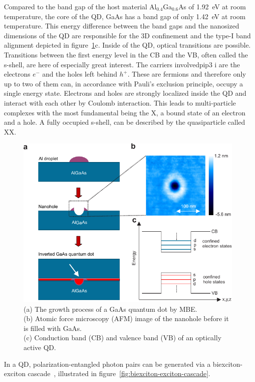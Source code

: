 Compared to the band gap of the host material Al$_{0.4}$Ga$_{0.6}$As of \SI{1.92}{\electronvolt} at room temperature, the core of the \ac{QD}, GaAs has a band gap of only \SI{1.42}{\electronvolt} at room temperature.
This energy difference between the band gaps and the nanosized dimensions of the \ac{QD} are responsible for the $3$D confinement and the type-I band alignment depicted in figure~\ref{fig:droplet-etched-gaas-qds}c.
Inside of the \ac{QD}, optical transitions are possible.
Transitions between the first energy level in the \ac{CB} and the \ac{VB}, often called the s-shell, are here of especially great interest.
The carriers involvedpip3 i are the electrons $e^-$ and the holes left behind $h^+$.
These are fermions and therefore only up to two of them can, in accordance with Pauli's exclusion principle, occupy a single energy state.
Electrons and holes are strongly localized inside the \ac{QD} and interact with each other by Coulomb interaction.
This leads to multi-particle complexes with the most fundamental being the \acf{X}, a bound state of an electron and a hole.
A fully occupied s-shell, can be described by the quasiparticle called \acf{XX}.
\begin{figure}[H]
	\centering
	\includegraphics[width=0.8\linewidth]{figures/quantum-dot/droplet-etched-gaas-qds}
	\caption[Droplet etched GaAs quantum dots.]{(a) The growth process of a GaAs quantum dot by \ac{MBE}.\\
	(b) Atomic force microscopy (AFM) image of the nanohole before it is filled with GaAs.\\
    (c) Conduction band (CB) and valence band (VB) of an optically active QD.~\cite{huber_gaas_2019}}
	\label{fig:droplet-etched-gaas-qds}
\end{figure}
In a \ac{QD}, polarization-entangled photon pairs can be generated via a biexciton-exciton cascade~\cite{stevenson_semiconductor_2006}, illustrated in figure~\ref{fig:biexciton-exciton-cascade}.

